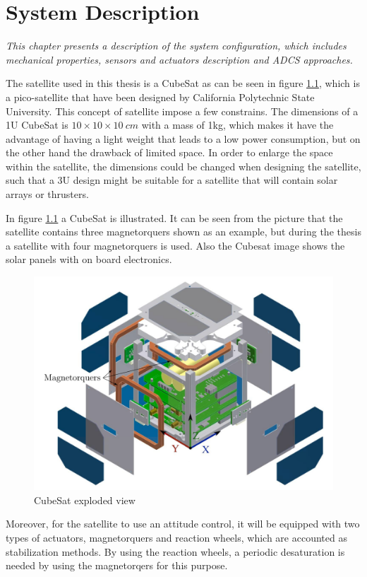 \chapter{System Description}\label{chap:systemDescribtion}
\textit{This chapter presents a description of the system configuration, which includes mechanical properties, sensors and actuators description and ADCS approaches.}

The satellite used in this thesis is a CubeSat as can be seen in figure \ref{fig:cube}, which is a pico-satellite that have been designed by California Polytechnic State University. This concept of satellite impose a few constrains. The dimensions of a 1U CubeSat  is $10 \times 10 \times 10 \ cm$ with a mass of 1kg, which makes it have the advantage of having a light weight that leads to a low power consumption, but on the other hand the drawback of limited space. In order to enlarge the space within the satellite, the dimensions could be changed when designing the satellite, such that a 3U design might be suitable for a satellite that will contain solar arrays or thrusters.

In figure \ref{fig:cube} a CubeSat is illustrated. It can be seen from the picture that the satellite contains three magnetorquers shown as an example, but during the thesis a satellite with four magnetorquers is used. Also the Cubesat image shows the solar panels with on board electronics.

\begin{figure}[H]
	\centering
	\includegraphics[width=0.7\linewidth]{figures/cubesat}
	\caption{CubeSat exploded view \cite{report}}
	\label{fig:cube}
\end{figure}

Moreover, for the satellite to use an attitude control, it will be equipped with two types of actuators, magnetorquers and reaction wheels, which are accounted as stabilization methods. By using the reaction wheels, a periodic desaturation is needed by using the magnetorqers for this purpose.

